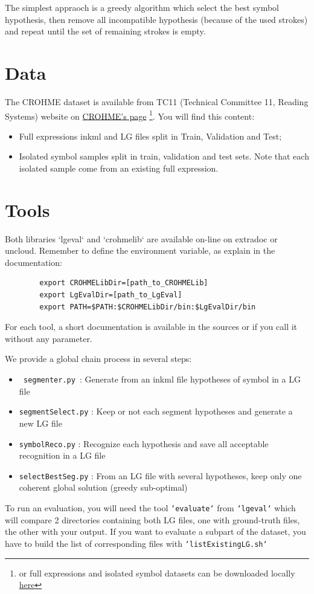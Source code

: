 \documentclass{article}
\begin{document}
The simplest appraoch is a greedy algorithm which select the best symbol hypothesis, then remove all incompatible hypothesis (because of the used strokes) and repeat until the set of remaining strokes is empty.
\section{Data}
The CROHME dataset is available from TC11 (Technical Committee 11, Reading Systems) website on  \href{http://tc11.cvc.uab.es/datasets/ICFHR-CROHME-2016_1}{CROHME's page}
\footnote{or full expressions and isolated symbol datasets can be downloaded locally \href{https://uncloud.univ-nantes.fr/index.php/s/OdAtErZgxKGjsNy}{here}}.
You will find this content:
\begin{itemize}
\item Full expressions inkml and LG files split in Train, Validation and Test;
\item Isolated symbol samples split in train, validation and test sets. Note that each isolated sample come from an existing full expression.
\end{itemize}
\section{Tools}

Both libraries `lgeval` and `crohmelib` are available on-line on extradoc or uncloud. Remember to define the environment variable, as explain in the documentation:
\begin{verbatim}
        export CROHMELibDir=[path_to_CROHMELib]
        export LgEvalDir=[path_to_LgEval]
        export PATH=$PATH:$CROHMELibDir/bin:$LgEvalDir/bin 
\end{verbatim} 

For each tool, a short documentation is available in the sources or if you call it without any parameter.

We provide a global chain process in several steps:
\begin{itemize}
\item \texttt{ segmenter.py }: Generate from an inkml file hypotheses of symbol in a LG file
\item \texttt{segmentSelect.py} : Keep or not each segment hypotheses and generate a new LG file 
\item \texttt{symbolReco.py} : Recognize each hypothesis and save all acceptable recognition in a LG file
\item \texttt{selectBestSeg.py} : From an LG file with several hypotheses, keep only one coherent global solution (greedy sub-optimal)
\end{itemize}

To run an evaluation, you will need the tool \texttt{`evaluate`} from \texttt{`lgeval`} which will compare 2 directories containing both LG files, one with ground-truth files, the other with your output. If you want to evaluate a subpart of the dataset, you have to build the list of corresponding files with \texttt{`listExistingLG.sh`}
\end{document}
